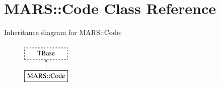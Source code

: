 \hypertarget{classMARS_1_1Code}{}\section{M\+A\+RS\+:\+:Code Class Reference}
\label{classMARS_1_1Code}
Inheritance diagram for M\+A\+RS\+:\+:Code\+:\begin{figure}[H]
\begin{center}
\leavevmode
\includegraphics[height=2.000000cm]{classMARS_1_1Code}
\end{center}
\end{figure}
